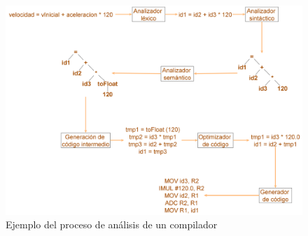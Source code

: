 \begin{figure}[hp!]
    \centering
    \includegraphics[width=1.0\textwidth]{imaxes/c-bases-teoricas/analisis-lexico-sintactico.png}
    \caption{Ejemplo del proceso de análisis de un compilador}
    \label{fig:analisis-lexico-sintáctico}
\end{figure}







